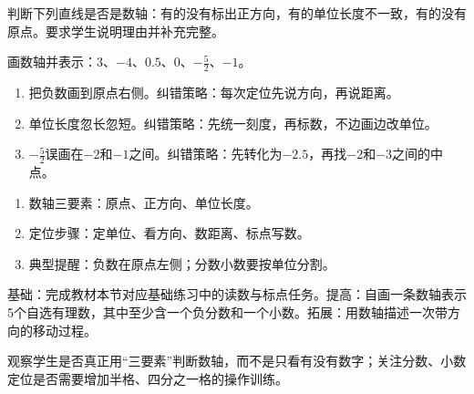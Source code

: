 \documentclass[UTF8,a4paper,11pt]{ctexart}
\begin{document}
判断下列直线是否是数轴：有的没有标出正方向，有的单位长度不一致，有的没有原点。要求学生说明理由并补充完整。

画数轴并表示：\(3\)、\(-4\)、\(0.5\)、\(0\)、\(-\frac{5}{2}\)、\(-1\)。

\begin{center}
\end{center}

\begin{enumerate}
\item 把负数画到原点右侧。纠错策略：每次定位先说方向，再说距离。
\item 单位长度忽长忽短。纠错策略：先统一刻度，再标数，不边画边改单位。
\item \(-\frac{5}{2}\)误画在\(-2\)和\(-1\)之间。纠错策略：先转化为\(-2.5\)，再找\(-2\)和\(-3\)之间的中点。
\end{enumerate}


\begin{enumerate}
\item 数轴三要素：原点、正方向、单位长度。
\item 定位步骤：定单位、看方向、数距离、标点写数。
\item 典型提醒：负数在原点左侧；分数小数要按单位分割。
\end{enumerate}

基础：完成教材本节对应基础练习中的读数与标点任务。提高：自画一条数轴表示5个自选有理数，其中至少含一个负分数和一个小数。拓展：用数轴描述一次带方向的移动过程。

观察学生是否真正用“三要素”判断数轴，而不是只看有没有数字；关注分数、小数定位是否需要增加半格、四分之一格的操作训练。
\end{document}
